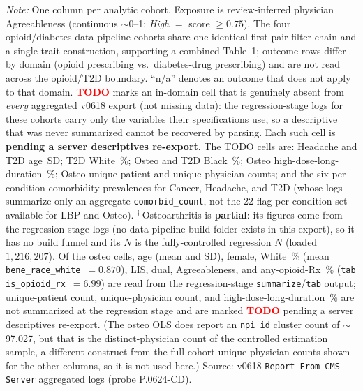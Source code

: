 \begin{table}[htbp]
\begin{flushleft}
\smallskip
\textit{Note:} One column per analytic cohort. Exposure is review-inferred physician
Agreeableness (continuous $\sim$0--1; \textit{High} $=$ score $\geq 0.75$). The four
opioid/diabetes data-pipeline cohorts share one identical first-pair filter chain and a
single trait construction, supporting a combined Table~1; outcome rows differ by domain
(opioid prescribing vs.\ diabetes-drug prescribing) and are not read across the
opioid/T2D boundary. ``n/a'' denotes an outcome that does not apply to that domain.
\textcolor{red}{\textbf{TODO}} marks an in-domain cell that is genuinely absent from
\emph{every} aggregated v0618 export (not missing data): the regression-stage logs for
these cohorts carry only the variables their specifications use, so a descriptive that
was never summarized cannot be recovered by parsing. Each such cell is
\textbf{pending a server descriptives re-export}. The TODO cells are: Headache and T2D
age~SD; T2D White~\%; Osteo and T2D Black~\%; Osteo high-dose-long-duration~\%;
Osteo unique-patient and unique-physician counts; and the six per-condition comorbidity prevalences for
Cancer, Headache, and T2D (whose logs summarize only an aggregate \texttt{comorbid\_count},
not the 22-flag per-condition set available for LBP and Osteo).
$^{\dagger}$\,Osteoarthritis is \textbf{partial}: its figures come from the
regression-stage logs (no data-pipeline build folder exists in this export), so it has
no build funnel and its $N$ is the fully-controlled regression $N$ (loaded $1{,}216{,}207$).
Of the osteo cells, age (mean and SD), female, White~\% (mean \texttt{bene\_race\_white}~$=0.870$),
LIS, dual, Agreeableness, and any-opioid-Rx~\% (\texttt{tab is\_opioid\_rx}~$=6.99$) are read
from the regression-stage \texttt{summarize}/\texttt{tab} output; unique-patient count,
unique-physician count, and high-dose-long-duration~\% are not summarized at the regression
stage and are marked \textcolor{red}{\textbf{TODO}} pending a server descriptives re-export.
(The osteo OLS does report an \texttt{npi\_id} cluster count of $\sim$97{,}027, but that is the
distinct-physician count of the controlled estimation sample, a different construct from the
full-cohort unique-physician counts shown for the other columns, so it is not used here.)
Source: v0618 \texttt{Report-From-CMS-Server} aggregated logs (probe P.0624-CD).
\end{flushleft}
\end{table}
